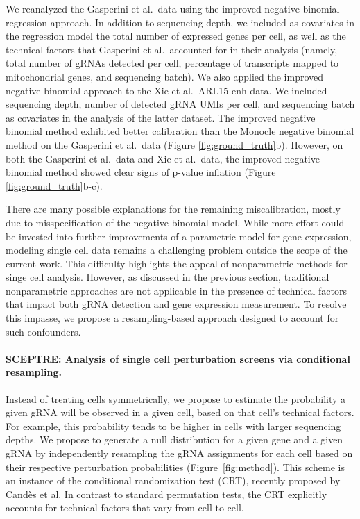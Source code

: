 \documentclass{nature}
\begin{document}
We reanalyzed the Gasperini et al.\ data using the improved negative binomial regression approach. In addition to sequencing depth, we included as covariates in the regression model the total number of expressed genes per cell, as well as the technical factors that Gasperini et al.\ accounted for in their analysis (namely, total number of gRNAs detected per cell, percentage of transcripts mapped to mitochondrial genes, and sequencing batch). We also applied the improved negative binomial approach to the Xie et al.\ ARL15-enh data. We included sequencing depth, number of detected gRNA UMIs per cell, and sequencing batch as covariates in the analysis of the latter dataset. The improved negative binomial method exhibited better calibration than the Monocle negative binomial method on the Gasperini et al.\ data (Figure \ref{fig:ground_truth}b). However, on both the Gasperini et al.\ data and Xie et al.\ data, the improved negative binomial method showed clear signs of p-value inflation (Figure \ref{fig:ground_truth}b-c).

There are many possible explanations for the remaining miscalibration, mostly due to misspecification of the negative binomial model. While more effort could be invested into further improvements of a parametric model for gene expression, modeling single cell data remains a challenging problem outside the scope of the current work. This difficulty highlights the appeal of nonparametric methods for singe cell analysis.\cite{Zhu2019} However, as discussed in the previous section, traditional nonparametric approaches are not applicable in the presence of technical factors that impact both gRNA detection and gene expression measurement. To resolve this impasse, we propose a resampling-based approach designed to account for such confounders.

\paragraph{SCEPTRE: Analysis of single cell perturbation screens via conditional resampling.} 

Instead of treating cells symmetrically, we propose to estimate the probability a given gRNA will be observed in a given cell, based on that cell's technical factors. For example, this probability tends to be higher in cells with larger sequencing depths. We propose to generate a null distribution for a given gene and a given gRNA by independently resampling the gRNA assignments for each cell based on their respective perturbation probabilities (Figure~\ref{fig:method}). This scheme is an instance of the conditional randomization test (CRT), recently proposed by Cand\`{e}s et al.\cite{CetL16} In contrast to standard permutation tests, the CRT explicitly accounts for technical factors that vary from cell to cell.
\end{document}

